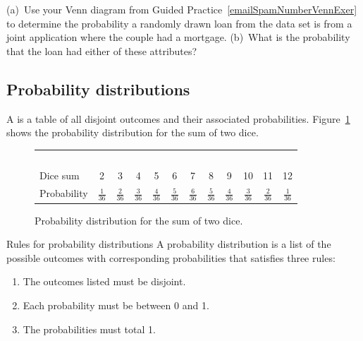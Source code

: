 \begin{exercisewrap}
\begin{nexercise}
(a)~Use your Venn diagram from Guided Practice~\ref{emailSpamNumberVennExer} to determine the
probability a randomly drawn loan from the 
data set is from a joint application where the couple had
a mortgage.
(b)~What is the probability that the loan had either of
these attributes?\footnotemark
\end{nexercise}
\end{exercisewrap}



\D{\newpage}

\subsection{Probability distributions}

A  is a table of all disjoint outcomes and their associated probabilities. Figure~\ref{diceProb} shows the probability distribution for the sum of two dice. 

\begin{figure}[h] \small
\centering
\begin{tabular}{l ccc ccc ccc cc}
  \hline
  \ \vspace{-3mm} \\
Dice sum\vspace{0.3mm} & 2 & 3 & 4 & 5 & 6 & 7 & 8 & 9 & 10 & 11 & 12  \\
Probability & $\frac{1}{36}$ & $\frac{2}{36}$ & $\frac{3}{36}$ & $\frac{4}{36}$ & $\frac{5}{36}$ & $\frac{6}{36}$ & $\frac{5}{36}$ & $\frac{4}{36}$ & $\frac{3}{36}$ & $\frac{2}{36}$ & $\frac{1}{36}$\vspace{1mm} \\
   \hline
\end{tabular}
\caption{Probability distribution for the sum of two dice.}
\label{diceProb}
\end{figure}

\begin{onebox}{Rules for probability distributions}
A probability distribution is a list of the possible outcomes with corresponding probabilities that satisfies three rules: \vspace{-2mm}
\begin{enumerate}
\setlength{\itemsep}{0mm}
\item The outcomes listed must be disjoint.
\item Each probability must be between 0 and 1.
\item The probabilities must total 1. \vspace{1mm}
\end{enumerate}
\end{onebox}

